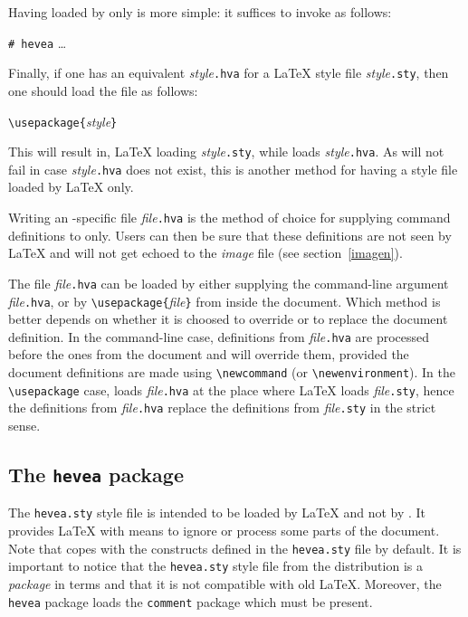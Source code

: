 \label{heveaonly}Having  loaded by \hevea{} only is more
simple: it  suffices to invoke \hevea{} as follows:
\begin{flushleft}
\verb+# hevea+ \ldots
\end{flushleft}


Finally, if one has an \hevea{} equivalent \textit{style}\texttt{.hva}
for a \LaTeX{} style file \textit{style}\texttt{.sty},
then one should load the file as follows:
\begin{flushleft}
\verb+\usepackage{+\textit{style}\verb+}+
\end{flushleft}
This will result in, \LaTeX{} loading \textit{style}\texttt{.sty},
while \hevea{} loads \textit{style}\texttt{.hva}.
As \hevea{} will not fail in case \textit{style}\texttt{.hva} does not
exist, this is another method for having a style file loaded by
\LaTeX{} only.

Writing an \hevea{}-specific file \textit{file}\texttt{.hva}
is the method of choice for supplying command definitions
to \hevea{} only. Users can then be sure that these definitions are
not seen by \LaTeX{} and will not get echoed to the \textit{image}
file (see section~\ref{imagen}).

The file \textit{file}\texttt{.hva} can be loaded by either
supplying the command-line argument
\textit{file}\texttt{.hva}, or by
\verb+\usepackage{+\textit{file}\verb+}+ from inside the document.
Which method is better depends
on whether it is choosed to override or to replace the document
definition.
In the command-line case,
definitions from \textit{file}\texttt{.hva} are processed before the
ones from the document and will override them, provided
the document definitions are made using \verb+\newcommand+ (or
\verb+\newenvironment+).
In the \verb+\usepackage+ case, \hevea{} loads \textit{file}\texttt{.hva}
at the place where \LaTeX{} loads \textit{file}\texttt{.sty}, hence
the definitions from \textit{file}\texttt{.hva} replace
the definitions from \textit{file}\texttt{.sty} in the strict sense.


\subsection{The \protect\texttt{hevea} package}\label{heveastyle}
The \texttt{hevea.sty} style file is intended to be loaded by \LaTeX{}
and not by \hevea{}.
It provides \LaTeX{} with means to ignore or process some parts of the
document.
Note that \hevea{} copes with the constructs defined in
the \texttt{hevea.sty} file by default.
It is important to notice that the \texttt{hevea.sty} style file from
the distribution is a \emph{package} in \LaTeXe{} terms and that it
is not compatible with old \LaTeX{}. Moreover, the \texttt{hevea}
package loads the \texttt{comment} package which must be present.


